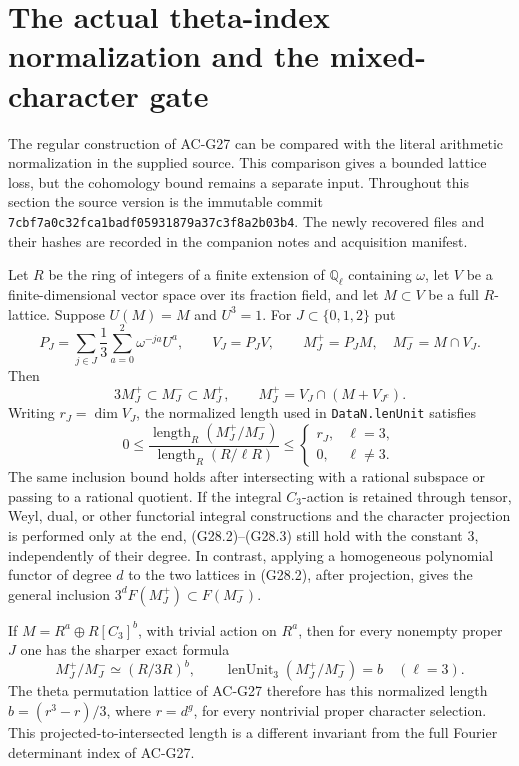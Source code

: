 \section{The actual theta-index normalization and the mixed-character gate}
\label{sec:theta-cohomology-interface}

The regular construction of AC-G27 can be compared with the
literal arithmetic normalization in the supplied source.  This
comparison gives a bounded lattice loss, but the cohomology
bound remains a separate input.  Throughout this section the
source version is the immutable commit
\texttt{7cbf7a0c32fca1badf05931879a37c3f8a2b03b4}.
The newly recovered files and their hashes are recorded in the
companion notes and acquisition manifest.

\begin{theorem}
\label{AC-G28}
Let $R$ be the ring of integers of a finite extension of
$\mathbb Q_\ell$ containing $\omega$, let $V$ be a finite-dimensional
vector space over its fraction field, and let $M\subset V$ be a
full $R$-lattice.  Suppose $U(M)=M$ and $U^3=1$.
For $J\subset\{0,1,2\}$ put
\[
 P_J=\sum_{j\in J}\frac13\sum_{a=0}^2\omega^{-ja}U^a,
 \qquad V_J=P_JV,
 \qquad M_J^+=P_JM,\quad M_J^-=M\cap V_J.
                                                        \tag{G28.1}
\]
Then
\[
 3M_J^+\subset M_J^-\subset M_J^+,
 \qquad
 M_J^+=V_J\cap(M+V_{J^c}).                              \tag{G28.2}
\]
Writing $r_J=\dim V_J$, the normalized length used in
\texttt{DataN.lenUnit} satisfies
\[
 0\le\frac{\operatorname{length}_R(M_J^+/M_J^-)}
      {\operatorname{length}_R(R/\ell R)}
 \le\begin{cases}
 r_J,&\ell=3,\\
 0,&\ell\ne3.
 \end{cases}                                            \tag{G28.3}
\]
The same inclusion bound holds after intersecting with a
rational subspace or passing to a rational quotient.  If the
integral $C_3$-action is retained through tensor, Weyl, dual,
or other functorial integral constructions and the character
projection is performed only at the end, (G28.2)--(G28.3)
still hold with the constant $3$, independently of their degree.
In contrast, applying a homogeneous polynomial functor of degree
$d$ to the two lattices in (G28.2), after projection, gives the
general inclusion $3^d F(M_J^+)\subset F(M_J^-)$.

If $M=R^a\oplus R[C_3]^b$, with trivial action on $R^a$, then
for every nonempty proper $J$ one has the sharper exact formula
\[
 M_J^+/M_J^-\simeq(R/3R)^b,
 \qquad \operatorname{lenUnit}_3(M_J^+/M_J^-)=b
                      \quad(\ell=3).                  \tag{G28.4}
\]
The theta permutation lattice of AC-G27 therefore has this
normalized length $b=(r^3-r)/3$, where $r=d^g$, for every
nontrivial proper character selection.  This projected-to-intersected
length is a different invariant from the full Fourier determinant
index of AC-G27.
\end{theorem}
